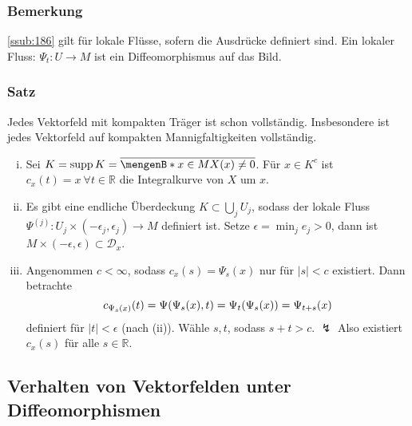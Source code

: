 \subsubsection{Bemerkung}
\label{ssub:161}
\ref{ssub:186} gilt für lokale Flüsse, sofern die Ausdrücke definiert sind. Ein lokaler Fluss: $\Psi_t:U\to M$ ist ein Diffeomorphismus auf das Bild.

\subsubsection{Satz}
\label{ssub:162}
Jedes Vektorfeld mit kompakten Träger ist schon vollständig. Insbesondere ist jedes Vektorfeld auf kompakten Mannigfaltigkeiten vollständig.
\begin{enumerate}[(i)]
\item 
{}
Sei $K = \supp K = \overline{\set[x\in M]{X(x)\neq 0}}$. Für $x\in K^c$ ist $c_x(t) = x\ \forall t\in \mathds{R}$ die Integralkurve von $X$ um $x$.
\item Es gibt eine endliche Überdeckung $K\subset \bigcup_j U_j$, sodass der lokale Fluss $\Psi^{(j)}: U_j\times (-\epsilon_j,\epsilon_j) \to M$ definiert ist. Setze $\epsilon = \min_j e_j > 0$, dann ist $M\times (-\epsilon,\epsilon)\subset \mathcal{D}_x$.
\item Angenommen $c < \infty$, sodass $c_x(s) = \Psi_s (x)$ nur für $|s| < c$ existiert. Dann betrachte
\[
c_{\Psi_s(x)} (t) = \Psi(\Psi_s (x), t) = \Psi_t(\Psi_s(x)) =\Psi_{t+s} (x)
\]
definiert für $|t| < \epsilon$ (nach (ii)). Wähle $s, t$, sodass $s+t > c$. $\lightning$ Also existiert $c_x(s)$ für alle $s\in \mathds{R}$.
\end{enumerate}

\subsection{Verhalten von Vektorfelden unter Diffeomorphismen}
\label{sub:19}

